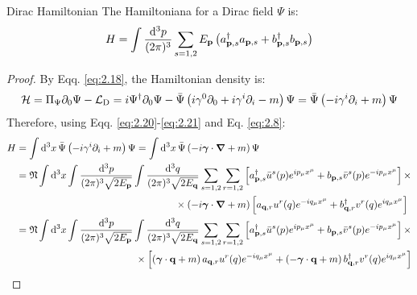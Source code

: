 \begin{proposition}{Dirac Hamiltonian}{}
  The Hamiltoniana for a Dirac field $ \Psi $ is:
  \begin{equation}
    H = \int \frac{\mathrm{d}^3p}{(2\pi)^3} \sum_{s = 1,2} E_{\mathbf{p}} \left( a_{\mathbf{p},s}^\dagger a_{\mathbf{p},s} + b_{\mathbf{p},s}^\dagger b_{\mathbf{p},s} \right)
    \label{eq:2.23}
  \end{equation}

  \tcblower

  \begin{proof}
    By Eqq. \ref{eq:2.18}, the Hamiltonian density is:
    \begin{equation*}
      \mathcal{H} = \Pi_\Psi \partial_0 \Psi - \mathcal{L}_\text{D} = i \Psi^\dagger \partial_0 \Psi - \bar{\Psi} \left( i \gamma^0 \partial_0 + i \gamma^i \partial_i - m \right) \Psi = \bar{\Psi} \left( -i \gamma^i \partial_i + m \right) \Psi
    \end{equation*}
    Therefore, using Eqq. \ref{eq:2.20}-\ref{eq:2.21} and Eq. \ref{eq:2.8}:
    \begin{equation*}
      \begin{split}
        H
        &= \int \mathrm{d}^3x\, \bar{\Psi} \left( -i \gamma^i \partial_i + m \right) \Psi = \int \mathrm{d}^3x\, \bar{\Psi} \left( -i \boldsymbol{\gamma} \cdot \boldsymbol{\nabla} + m \right) \Psi \\
        &= \mathfrak{N} \int \mathrm{d}^3x \int \frac{\mathrm{d}^3p}{(2\pi)^3 \sqrt{2E_{\mathbf{p}}}} \int \frac{\mathrm{d}^3q}{(2\pi)^3 \sqrt{2E_{\mathbf{q}}}} \sum_{s = 1,2} \sum_{r = 1,2} \left[ a_{\mathbf{p},s}^\dagger \bar{u}^s(p) e^{ip_\mu x^\mu} + b_{\mathbf{p},s} \bar{v}^s(p) e^{-ip_\mu x^\mu} \right] \times \\
        & \qquad \qquad \qquad \qquad \qquad \qquad \qquad \qquad \times \left( -i \boldsymbol{\gamma} \cdot \boldsymbol{\nabla} + m \right) \left[ a_{\mathbf{q},r} u^r(q) e^{-iq_\mu x^\mu} + b_{\mathbf{q},r}^\dagger v^r(q) e^{iq_\mu x^\mu} \right] \\
        &= \mathfrak{N} \int \mathrm{d}^3x \int \frac{\mathrm{d}^3p}{(2\pi)^3 \sqrt{2E_{\mathbf{p}}}} \int \frac{\mathrm{d}^3q}{(2\pi)^3 \sqrt{2E_{\mathbf{q}}}} \sum_{s = 1,2} \sum_{r = 1,2} \left[ a_{\mathbf{p},s}^\dagger \bar{u}^s(p) e^{i p_\mu x^\mu} + b_{\mathbf{p},s} \bar{v}^s(p) e^{-i p_\mu x^\mu} \right] \times \\
        & \qquad \qquad \qquad \qquad \qquad \qquad \times \left[ \left( \boldsymbol{\gamma} \cdot \mathbf{q} + m \right) a_{\mathbf{q},r} u^r(q) e^{-i q_\mu x^\mu} + \left( - \boldsymbol{\gamma} \cdot \mathbf{q} + m \right) b_{\mathbf{q},r}^\dagger v^r(q) e^{i q_\mu x^\mu} \right]
      \end{split}
    \end{equation*}

\end{proof}
\end{proposition}
